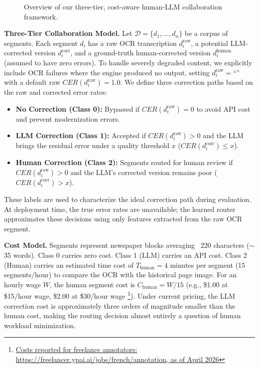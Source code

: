 \documentclass[sigconf]{acmart}
\begin{document}
\vspace{-1\baselineskip}
\begin{figure}[ht]
\centering
\resizebox{0.8\linewidth}{!}{}
\vspace{-\baselineskip}
\caption{Overview of our three-tier, cost-aware human-LLM collaboration framework.}
\label{fig:methodology}
\vspace{-1.5em}
\end{figure}

\medskip\noindent\textbf{Three-Tier Collaboration Model.}
Let $\mathcal{D} = \{d_1, \dots, d_n\}$ be a corpus of segments. Each segment $d_i$ has a raw OCR transcription $d_i^{\text{raw}}$, a potential LLM-corrected version $d_i^{\text{corr}}$, and a ground-truth human-corrected version $d_i^{\text{human}}$ (assumed to have zero errors). 
To handle severely degraded content, we explicitly include OCR failures where the engine produced no output, setting $d_i^{\text{raw}} = \text{``''}$ with a default raw $CER(d_i^{\text{raw}}) = 1.0$.
We define three correction paths based on the raw and corrected error rates: 
\begin{itemize}
    \item \textbf{No Correction (Class 0):} Bypassed if $CER(d_i^{\text{raw}}) = 0$ to avoid API cost and prevent modernization errors.
    \item \textbf{LLM Correction (Class 1):} Accepted if $CER(d_i^{\text{raw}}) > 0$ and the LLM brings the residual error under a quality threshold $x$ ($CER(d_i^{\text{corr}}) \leq x$).
    \item \textbf{Human Correction (Class 2):} Segments routed for human review if $CER(d_i^{\text{raw}}) > 0$ and the LLM's corrected version remains poor ($CER(d_i^{\text{corr}}) > x$).
\end{itemize}
These labels are used to characterize the ideal correction path during evaluation. At deployment time, the true error rates are unavailable; the learned router approximates these decisions using only features extracted from the raw OCR segment.

\medskip\noindent\textbf{Cost Model.}
Segments represent newspaper blocks averaging ~220 characters ($\sim$35 words). Class 0 carries zero cost. Class 1 (LLM) carries an API cost. Class 2 (Human) carries an estimated time cost of $T_{\text{human}} = 4$ minutes per segment (15 segments/hour) to compare the OCR with the historical page image. For an hourly wage $W$, the human segment cost is $C_{\text{human}} = W / 15$ (e.g., \$1.00 at \$15/hour wage, \$2.00 at \$30/hour wage \footnote{ \href{https://freelancer.ypai.ai/jobs/french/annotation}{Costs reported for freelance annotators: https://freelancer.ypai.ai/jobs/french/annotation, as of April 2026}}). Under current pricing, the LLM correction cost is approximately three orders of magnitude smaller than the human cost, making the routing decision almost entirely a question of human workload minimization.
\end{document}
